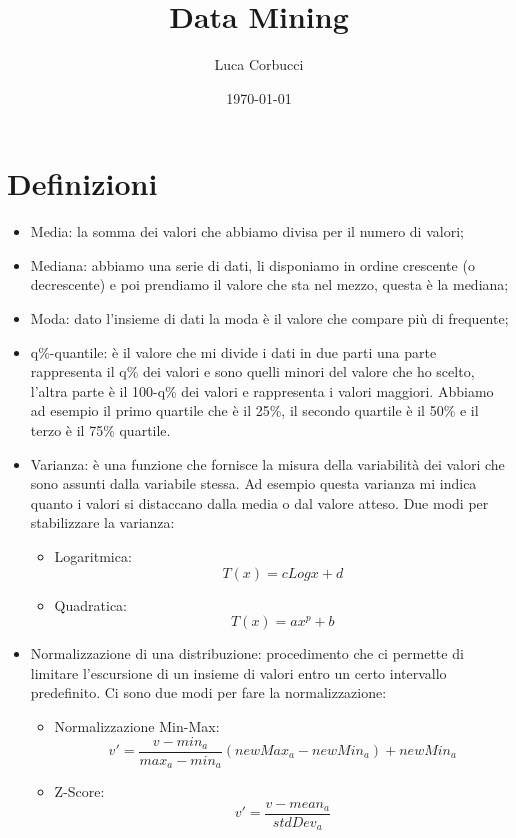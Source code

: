\documentclass[14pt]{extreport}
\title{Data Mining}
\author{Luca Corbucci}
\date{\today}
\begin{document}
\maketitle

\tableofcontents

\chapter{Definizioni}

\begin{itemize}
\item Media: la somma dei valori che abbiamo divisa per il numero di valori;
\item Mediana: abbiamo una serie di dati, li disponiamo in ordine crescente (o decrescente) e poi prendiamo il valore che sta nel mezzo, questa è la mediana;
\item Moda: dato l'insieme di dati la moda è il valore che compare più di frequente;
\item q\%-quantile: è il valore che mi divide i dati in due parti una parte rappresenta il q\% dei valori e sono quelli minori del valore che ho scelto, l'altra parte è il 100-q\% dei valori e rappresenta i valori maggiori. Abbiamo ad esempio il primo quartile che è il 25\%, il secondo quartile è il 50\% e il terzo è il 75\% quartile.
\item Varianza: è una funzione che fornisce la misura della variabilità dei valori che sono assunti dalla variabile stessa. Ad esempio questa varianza mi indica quanto i valori si distaccano dalla media o dal valore atteso.
Due modi per stabilizzare la varianza:
\begin{itemize}
\item Logaritmica: 
\begin{equation}
T(x) = cLogx + d
\end{equation}
\item Quadratica:
\begin{equation}
T(x) = ax^p + b
\end{equation}
\end{itemize}
\item Normalizzazione di una distribuzione: procedimento che ci permette di limitare l'escursione di un insieme di valori entro un certo intervallo predefinito.
Ci sono due modi per fare la normalizzazione:
\begin{itemize}
\item Normalizzazione Min-Max: 
\begin{equation}
v' = \frac{v-min_a}{max_a - min_a} (newMax_a - newMin_a) + newMin_a
\end{equation}
\item Z-Score:
\begin{equation}
v' = \frac{v-mean_a}{stdDev_a}
\end{equation}
\end{itemize}
\end{itemize}
\end{document}
